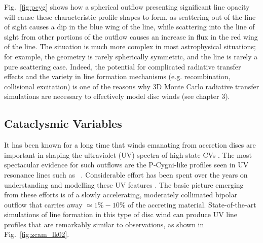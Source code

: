 Fig.~\ref{fig:pcyg} shows how a spherical outflow presenting
significant line opacity will 
cause these characteristic profile shapes to form, 
as scattering out of the line of sight 
causes a dip in the blue wing of the line, while scattering into the 
line of sight from other portions of the outflow causes an increase in flux
in the red wing of the line. The situation is much more complex in most
astrophysical situations; for example, the geometry is rarely spherically 
symmetric, and the line is rarely a pure scattering case. 
Indeed, the potential 
for complicated radiative transfer effects and 
the variety in line formation mechanisms 
(e.g. recombination, collisional excitation)
is one of the reasons why 3D Monte Carlo radiative 
transfer simulations are necessary
to effectively model disc winds (see chapter 3).



\subsection{Cataclysmic Variables}
\label{sec:cv_winds}
It has been known for a long time that winds emanating from
accretion discs are important in shaping the ultraviolet (UV) spectra
of high-state CVs \citep{heap1978, greensteinoke1982}. 
The most spectacular evidence for such
outflows are the P-Cygni-like profiles seen in UV resonance lines such as
\civfull\ \citep[e.g. ][see Fig.~\ref{fig:cordova}]{cordova1982}. 
Considerable effort has been spent over the
years on understanding and modelling these UV features 
\citep[e.g.][]{drewverbunt1985,maucheraymond1987,SV93,KWD95,
kd1997,knigge1997,LK02,noebauer,puebla2011}. 
The basic picture emerging from these efforts is
of a slowly accelerating, moderately collimated bipolar
outflow that carries away $\simeq 1\% - 10\%$ of the accreting
material. State-of-the-art simulations of line formation in this type
of disc wind can produce UV line profiles that are remarkably similar
to observations, as shown in Fig.~\ref{fig:zcam_lk02}.

